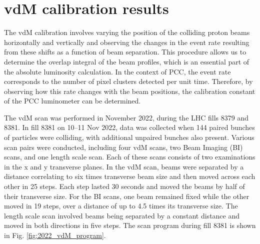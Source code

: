 \newpage
\section{vdM calibration results}

The vdM calibration involves varying the position of the colliding proton beams horizontally and vertically and observing the changes in the event rate resulting from these shifts as a function of beam separation. This procedure allows us to determine the overlap integral of the beam profiles, which is an essential part of the absolute luminosity calculation. In the context of PCC, the event rate corresponds to the number of pixel clusters detected per unit time. Therefore, by observing how this rate changes with the beam positions, the calibration constant of the PCC luminometer can be determined. %


The vdM scan was performed in November 2022, during the LHC fills 8379 and 8381. In fill 8381 on 10–11 Nov 2022, data was collected when 144 paired bunches of particles were colliding, with additional unpaired bunches also present. Various scan pairs were conducted, including four vdM scans, two Beam Imaging (BI) scans, and one length scale scan. Each of these scans consists of two examinations in the x and y transverse planes. In the vdM scan, beams were separated by a distance correlating to six times transverse beam size and then moved across each other in 25 steps. Each step lasted 30 seconds and moved the beams by half of their transverse size. For the BI scans, one beam remained fixed while the other moved in 19 steps, over a distance of up to 4.5 times its transverse size. The length scale scan involved beams being separated by a constant distance and moved in both directions in five steps. The scan program during fill 8381 is shown in Fig. \ref{fig:2022_vdM_program}.

